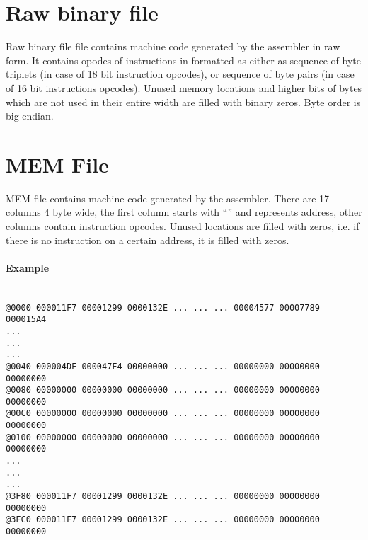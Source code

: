 \section{Raw binary file}
    Raw binary file file contains machine code generated by the assembler in raw form. It contains opodes of instructions in formatted as either as sequence of byte triplets (in case of 18 bit instruction opcodes), or sequence of byte pairs (in case of 16 bit instructions opcodes). Unused memory locations and higher bits of bytes which are not used in their entire width are filled with binary zeros. Byte order is big-endian.

\clearpage
\section{MEM File}
    MEM file contains machine code generated by the assembler. There are 17 columns 4 byte wide, the first column starts with ``\@'' and represents address, other columns contain instruction opcodes. Unused locations are filled with zeros, i.e. if there is no instruction on a certain address, it is filled with zeros.

    \paragraph{Example}
        ~\\
        \verb'@0000 000011F7 00001299 0000132E ... ... ... 00004577 00007789 000015A4'\\
        \verb'...'\\
        \verb'...'\\
        \verb'...'\\
        \verb'@0040 000004DF 000047F4 00000000 ... ... ... 00000000 00000000 00000000'\\
        \verb'@0080 00000000 00000000 00000000 ... ... ... 00000000 00000000 00000000'\\
        \verb'@00C0 00000000 00000000 00000000 ... ... ... 00000000 00000000 00000000'\\
        \verb'@0100 00000000 00000000 00000000 ... ... ... 00000000 00000000 00000000'\\
        \verb'...'\\
        \verb'...'\\
        \verb'...'\\
        \verb'@3F80 000011F7 00001299 0000132E ... ... ... 00000000 00000000 00000000'\\
        \verb'@3FC0 000011F7 00001299 0000132E ... ... ... 00000000 00000000 00000000'\\

